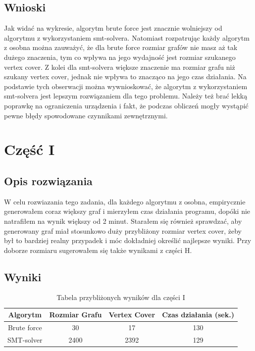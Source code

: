 \documentclass{article}
\begin{document}
\subsection{Wnioski}
Jak widać na wykresie, algorytm brute force jest znacznie wolniejszy od algorytmu z wykorzystaniem smt-solvera.
Natomiast rozpatrując każdy algorytm z osobna można zauważyć, że dla brute force rozmiar grafów nie masz aż tak dużego znaczenia, 
tym co wpływa na jego wydajność jest rozmiar szukanego vertex cover. 
Z kolei dla smt-solvera większe znaczenie ma rozmiar grafu niż szukany vertex cover, jednak nie wpływa to znacząco na jego czas działania.
Na podstawie tych obserwacji można wywnioskować, że algorytm z wykorzystaniem smt-solvera jest lepszym rozwiązaniem dla tego problemu.
Należy też brać lekką poprawkę na ograniczenia urządzenia i fakt, że podczas obliczeń mogły wystąpić pewne błędy spowodowane czynnikami zewnętrznymi.

\section{Część I}
\subsection{Opis rozwiązania}
W celu rozwiazania tego zadania, dla każdego algorytmu z osobna, 
empirycznie generowałem coraz większy graf i mierzyłem czas działania programu,
dopóki nie natrafiłem na wynik większy od 2 minut. Starałem się również sprawdzać, 
aby generowany graf miał stosunkowo duży przybliżony rozmiar vertex cover, żeby 
był to bardziej realny przypadek i móc dokładniej określić najlepsze wyniki. 
Przy doborze rozmiaru sugerowałem się także wynikami z części H.

\subsection{Wyniki}
\begin{table}[h!]
    \centering
    \begin{tabular}{cccc}
        \toprule
        Algorytm & Rozmiar Grafu & Vertex Cover & Czas działania (sek.) \\
        \midrule
        Brute force & 30 & 17 & 130 \\
        SMT-solver & 2400 & 2392 & 129 \\
        \bottomrule
    \end{tabular}
    \caption{Tabela przybliżonych wyników dla części I}
    \label{tab:resultsI}
\end{table}
\end{document}
